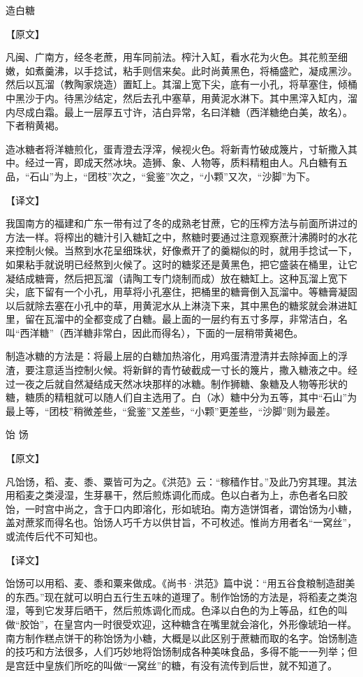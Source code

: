 \documentclass[12pt,UTF8]{ctexbook}
\begin{document}
造白糖

【原文】

凡闽、广南方，经冬老蔗，用车同前法。榨汁入缸，看水花为火色。其花煎至细嫩，如煮羹沸，以手捻试，粘手则信来矣。此时尚黄黑色，将桶盛贮，凝成黑沙。然后以瓦溜（教陶家烧造）置缸上。其溜上宽下尖，底有一小孔，将草塞住，倾桶中黑沙于内。待黑沙结定，然后去孔中塞草，用黄泥水淋下。其中黑滓入缸内，溜内尽成白霜。最上一层厚五寸许，洁白异常，名曰洋糖（西洋糖绝白美，故名）。下者稍黄褐。

造冰糖者将洋糖煎化，蛋青澄去浮滓，候视火色。将新青竹破成篾片，寸斩撒入其中。经过一宵，即成天然冰块。造狮、象、人物等，质料精粗由人。凡白糖有五品，“石山”为上，“团枝”次之，“瓮鉴”次之，“小颗”又次，“沙脚”为下。

【译文】

我国南方的福建和广东一带有过了冬的成熟老甘蔗，它的压榨方法与前面所讲过的方法一样。将榨出的糖汁引入糖缸之中，熬糖时要通过注意观察蔗汁沸腾时的水花来控制火候。当熬到水花呈细珠状，好像煮开了的羹糊似的时，就用手捻试一下，如果粘手就说明已经熬到火候了。这时的糖浆还是黄黑色，把它盛装在桶里，让它凝结成糖膏，然后把瓦溜（请陶工专门烧制而成）放在糖缸上。这种瓦溜上宽下尖，底下留有一个小孔，用草将小孔塞住，把桶里的糖膏倒入瓦溜中。等糖膏凝固以后就除去塞在小孔中的草，用黄泥水从上淋浇下来，其中黑色的糖浆就会淋进缸里，留在瓦溜中的全都变成了白糖。最上面的一层约有五寸多厚，非常洁白，名叫“西洋糖”（西洋糖非常白，因此而得名），下面的一层稍带黄褐色。

制造冰糖的方法是：将最上层的白糖加热溶化，用鸡蛋清澄清并去除掉面上的浮渣，要注意适当控制火候。将新鲜的青竹破截成一寸长的篾片，撒入糖液之中。经过一夜之后就自然凝结成天然冰块那样的冰糖。制作狮糖、象糖及人物等形状的糖，糖质的精粗就可以随人们自主选用了。白（冰）糖中分为五等，其中“石山”为最上等，“团枝”稍微差些，“瓮鉴”又差些，“小颗”更差些，“沙脚”则为最差。

饴 饧

【原文】

凡饴饧，稻、麦、黍、粟皆可为之。《洪范》云：“稼穑作甘。”及此乃穷其理。其法用稻麦之类浸湿，生芽暴干，然后煎炼调化而成。色以白者为上，赤色者名曰胶饴，一时宫中尚之，含于口内即溶化，形如琥珀。南方造饼饵者，谓饴饧为小糖，盖对蔗浆而得名也。饴饧人巧千方以供甘旨，不可枚述。惟尚方用者名“一窝丝”，或流传后代不可知也。

【译文】

饴饧可以用稻、麦、黍和粟来做成。《尚书·洪范》篇中说：“用五谷食粮制造甜美的东西。”现在就可以明白五行生五味的道理了。制作饴饧的方法是，将稻麦之类泡湿，等到它发芽后晒干，然后煎炼调化而成。色泽以白色的为上等品，红色的叫做“胶饴”，在皇宫内一时很受欢迎，这种糖含在嘴里就会溶化，外形像琥珀一样。南方制作糕点饼干的称饴饧为小糖，大概是以此区别于蔗糖而取的名字。饴饧制造的技巧和方法很多，人们巧妙地将饴饧制成各种美味食品，多得不能一一列举；但是宫廷中皇族们所吃的叫做“一窝丝”的糖，有没有流传到后世，就不知道了。
\end{document}

